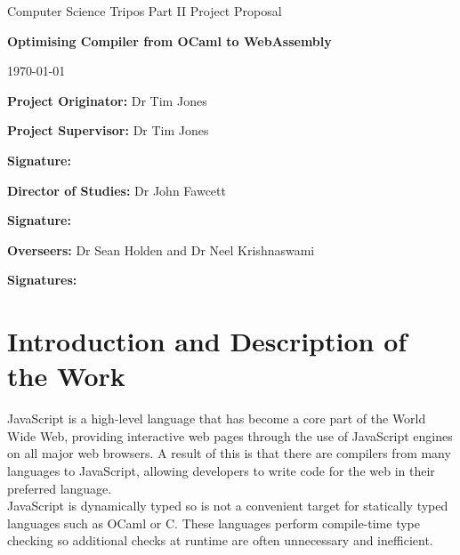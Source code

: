 \documentclass[12pt]{article}
\newcommand{\al}{$<$}
\newcommand{\ar}{$>$}
\begin{document}
\thispagestyle{empty}

\medskip
{}
\medskip
{}

\vfil

\centerline{\large Computer Science Tripos Part II Project Proposal}
\vspace{0.4in}
\centerline{\Large\bf Optimising Compiler from OCaml to WebAssembly}
\vspace{0.3in}
\centerline{\large \today}

\vfil

{\bf Project Originator:} Dr Tim Jones



\vspace{0.5in}

{\bf Project Supervisor:} Dr Tim Jones

\vspace{0.2in}

{\bf Signature:}

\vspace{0.5in}

{\bf Director of Studies:} Dr John Fawcett

\vspace{0.2in}

{\bf Signature:}

\vspace{0.5in}

{\bf Overseers:} Dr Sean Holden and Dr Neel Krishnaswami

\vspace{0.2in}

{\bf Signatures:}%

\vfil
\eject

\section*{Introduction and Description of the Work}
JavaScript is a high-level language that has become a core part of the World Wide Web, providing interactive web pages through the use of JavaScript engines on all major web browsers. A result of this is that there are compilers from many languages to JavaScript, allowing developers to write code for the web in their preferred language. \\
JavaScript is dynamically typed so is not a convenient target for statically typed languages such as OCaml or C. These languages perform compile-time type checking so additional checks at runtime are often unnecessary and inefficient. 
\end{document}
